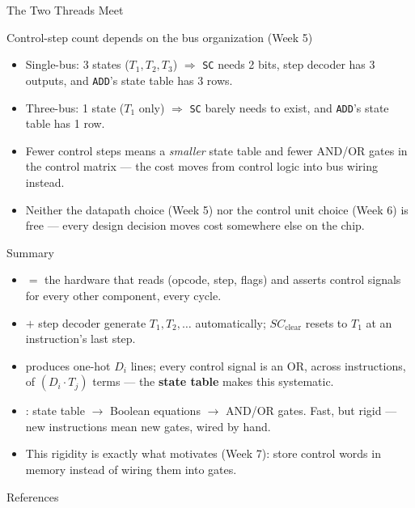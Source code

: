 \documentclass[aspectratio=169]{beamer}
\begin{document}
\begin{frame}{The Two Threads Meet}
  \begin{block}{Control-step count depends on the bus organization (Week 5)}
    \begin{itemize}
      \item Single-bus: 3 states ($T_1, T_2, T_3$) $\Rightarrow$ \texttt{SC} needs 2
        bits, step decoder has 3 outputs, and \texttt{ADD}'s state table has 3 rows.
      \item Three-bus: 1 state ($T_1$ only) $\Rightarrow$ \texttt{SC} barely needs
        to exist, and \texttt{ADD}'s state table has 1 row.
    \end{itemize}
  \end{block}
  \begin{itemize}
    \item Fewer control steps means a \emph{smaller} state table and fewer AND/OR
      gates in the control matrix --- the cost moves from control logic into bus
      wiring instead.
    \item Neither the datapath choice (Week 5) nor the control unit choice
      (Week 6) is free --- every design decision moves cost somewhere else on the
      chip.
  \end{itemize}
\end{frame}

\begin{frame}{Summary}
  \begin{itemize}
    \item {} $=$ the hardware that reads (opcode, step, flags)
      and asserts control signals for every other component, every cycle.
    \item {} $+$ step decoder generate
      $T_1, T_2, \dots$ automatically; $SC_{\text{clear}}$ resets to $T_1$ at an
      instruction's last step.
    \item {} produces one-hot $D_i$ lines; every control signal
      is an OR, across instructions, of $(D_i \cdot T_j)$ terms --- the
      \textbf{state table} makes this systematic.
    \item {}: state table $\to$ Boolean equations $\to$
      AND/OR gates. Fast, but rigid --- new instructions mean new gates, wired by
      hand.
    \item This rigidity is exactly what motivates 
      (Week 7): store control words in memory instead of wiring them into gates.
  \end{itemize}
\end{frame}

\begin{frame}{References}
  \footnotesize
  
  
\end{frame}
\end{document}
